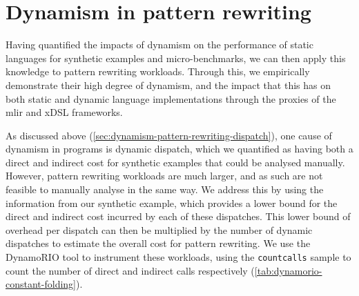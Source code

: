 








\section{Dynamism in pattern rewriting}
\label{chap:dynamism-pattern-rewriting-summary}


Having quantified the impacts of dynamism on the performance of static languages for synthetic examples and micro-benchmarks, we can then apply this knowledge to pattern rewriting workloads.
Through this, we empirically demonstrate their high degree of dynamism, and the impact that this has on both static and dynamic language implementations through the proxies of the \ac{mlir} and xDSL frameworks.

As discussed above (\autoref{sec:dynamism-pattern-rewriting-dispatch}), one cause of dynamism in programs is dynamic dispatch, which we quantified as having both a direct and indirect cost for synthetic examples that could be analysed manually.
However, pattern rewriting workloads are much larger, and as such are not feasible to manually analyse in the same way. We address this by using the information from our synthetic example, which provides a lower bound for the direct and indirect cost incurred by each of these dispatches. %
This lower bound of overhead per dispatch can then be multiplied by the number of dynamic dispatches to estimate the overall cost for pattern rewriting.
We use the DynamoRIO \cite{brueningInfrastructureAdaptiveDynamic2003} tool to instrument these workloads, using the \texttt{countcalls} sample to count the number of direct and indirect calls respectively (\autoref{tab:dynamorio-constant-folding}).

